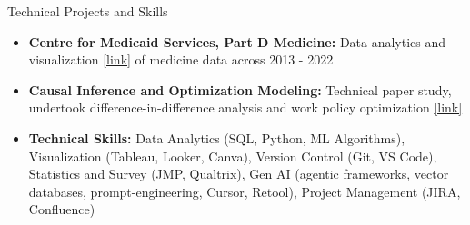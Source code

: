 \documentclass{resume} %
\begin{document}
\begin{rSection}{Technical Projects and Skills}
\begin{itemize}
\item \textbf{Centre for Medicaid Services, Part D Medicine:} Data analytics and visualization \href{link}{[link]} of medicine data across 2013 - 2022
\item \textbf{Causal Inference and Optimization Modeling:} Technical paper study, undertook difference-in-difference analysis and work policy optimization \href{link}{[link]}
\item \textbf{Technical Skills:} Data Analytics (SQL, Python, ML Algorithms), Visualization (Tableau, Looker, Canva), Version Control (Git, VS Code), Statistics and Survey (JMP, Qualtrix), Gen AI (agentic frameworks, vector databases, prompt-engineering, Cursor, Retool), Project Management (JIRA, Confluence)
\end{itemize}
\end{rSection}
\end{document}
